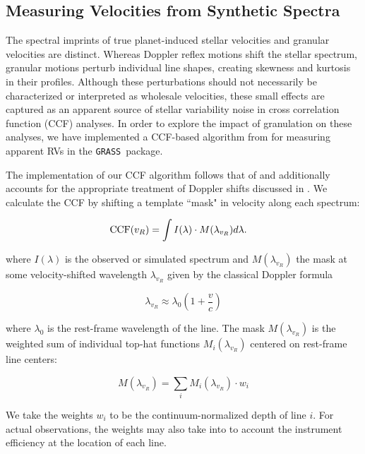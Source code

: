 \documentclass[twocolumn]{aastex63}
\newcommand{\grass}{\texttt{GRASS}}
\newcommand{\revise}[1]{#1}
\begin{document}
\subsection{Measuring Velocities from Synthetic Spectra} \label{subsec:veloc}
The spectral imprints of true planet-induced stellar velocities and granular velocities are distinct. Whereas Doppler reflex motions shift the stellar spectrum, granular motions perturb individual line shapes, creating skewness and kurtosis in their profiles. Although these perturbations should not necessarily be characterized or interpreted as wholesale velocities, these small effects are captured as an apparent source of stellar variability noise in cross correlation function (CCF) analyses. In order to explore the impact of granulation on these analyses, we have implemented a CCF-based algorithm \revise{from \citet{EchelleCCFs}} for measuring apparent RVs in the \grass\ package. \par  

The implementation of our CCF algorithm follows that of \citet{Pepe2002} \revise{and additionally accounts for the appropriate treatment of Doppler shifts discussed in \citet{Wright2019}.} We calculate the CCF by shifting a template ``mask" in velocity along each spectrum: 

\begin{align}
    {\rm CCF}(v_R) &= \int I(\lambda) \cdot M(\lambda_{v_R}) d\lambda.
\end{align}{}

\noindent where $I(\lambda)$ is the observed or simulated spectrum and $M(\lambda_{v_R})$ the mask at some velocity-shifted wavelength $\lambda_{v_R}$ given by the classical Doppler formula

\begin{equation}
    \lambda_{v_R} \approx \lambda_0 \left( 1 + \frac{v}{c} \right)
\end{equation}

\noindent where $\lambda_0$ is the rest-frame wavelength of the line. The mask $M(\lambda_{v_R})$ is the weighted sum of individual top-hat functions $M_i(\lambda_{v_R})$ centered on rest-frame line centers:

\begin{equation}
    M(\lambda_{v_R}) = \sum_i M_i(\lambda_{v_R}) \cdot w_i
\end{equation}{}

\noindent We take the weights $w_i$ to be the continuum-normalized depth of line $i$. For actual observations, the weights may also take into to account the instrument efficiency at the location of each line. \par 
\end{document}
